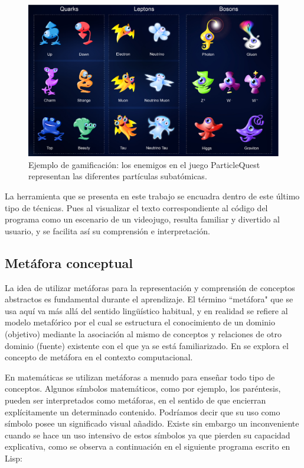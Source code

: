 \documentclass{llncs}
\begin{document}
\begin{figure}[ht]
\begin{center}
\includegraphics[scale=0.3]{images/particlequest.eps}
\caption{Ejemplo de gamificación: los enemigos en el juego ParticleQuest representan las diferentes partículas subatómicas.
\label{fig:particlequest}}
\end{center}
\end{figure}

La herramienta que se presenta en este trabajo se encuadra dentro de este último tipo de técnicas. Pues al visualizar el texto correspondiente al código del programa como un escenario de un videojugo, resulta familiar y divertido al usuario, y se facilita así su comprensión e interpretación.

\subsection{Metáfora conceptual}

La idea de utilizar metáforas para la representación y comprensión de conceptos abstractos es fundamental durante el aprendizaje. El término ``metáfora" que se usa aquí va más allá del sentido lingüístico habitual, y en realidad se refiere al modelo metafórico por el cual se estructura el conocimiento de un dominio (objetivo) mediante la asociación al mismo de conceptos y relaciones de otro dominio (fuente) existente con el que ya se está familiarizado. En \cite{travers1996programming} se explora el concepto de metáfora en el contexto computacional.

En matemáticas se utilizan metáforas a menudo para enseñar todo tipo de conceptos. Algunos símbolos matemáticos, como por ejemplo, los paréntesis, pueden ser interpretados como metáforas, en el sentido de que encierran explícitamente un determinado contenido. Podríamos decir que su uso como símbolo posee un significado visual añadido. Existe sin embargo un inconveniente cuando se hace un uso intensivo de estos símbolos ya que pierden su capacidad explicativa, como se observa a continuación en el siguiente programa escrito en Lisp:
\end{document}
